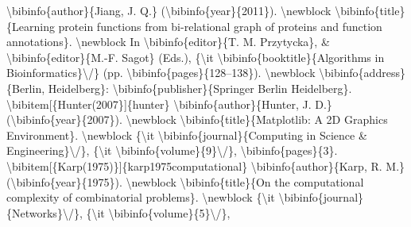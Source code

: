 \documentclass{article}%
\begin{document}
\textbackslash{}bibinfo\{author\}\{Jiang, J. Q.\} (\textbackslash{}bibinfo\{year\}\{2011\}).\newline%
\textbackslash{}newblock \textbackslash{}bibinfo\{title\}\{Learning protein functions from bi{-}relational graph\newline%
of proteins and function annotations\}.\newline%
\textbackslash{}newblock In \textbackslash{}bibinfo\{editor\}\{T. M. Przytycka\}, \& \textbackslash{}bibinfo\{editor\}\{M.{-}F.\newline%
Sagot\} (Eds.), \{\textbackslash{}it \textbackslash{}bibinfo\{booktitle\}\{Algorithms in Bioinformatics\}\textbackslash{}/\} (pp.\newline%
\textbackslash{}bibinfo\{pages\}\{128–138\}).\newline%
\textbackslash{}newblock \textbackslash{}bibinfo\{address\}\{Berlin, Heidelberg\}: \textbackslash{}bibinfo\{publisher\}\{Springer\newline%
Berlin Heidelberg\}.\newline%
\newline%
\textbackslash{}bibitem{[}\{Hunter(2007\}{]}\{hunter\}\newline%
\textbackslash{}bibinfo\{author\}\{Hunter, J. D.\} (\textbackslash{}bibinfo\{year\}\{2007\}).\newline%
\textbackslash{}newblock \textbackslash{}bibinfo\{title\}\{Matplotlib: A 2D Graphics Environment\}.\newline%
\textbackslash{}newblock \{\textbackslash{}it \textbackslash{}bibinfo\{journal\}\{Computing in Science \& Engineering\}\textbackslash{}/\}, \{\textbackslash{}it \textbackslash{}bibinfo\{volume\}\{9\}\textbackslash{}/\},\newline%
\textbackslash{}bibinfo\{pages\}\{3\}.\newline%
\textbackslash{}bibitem{[}\{Karp(1975)\}{]}\{karp1975computational\}\newline%
\textbackslash{}bibinfo\{author\}\{Karp, R. M.\} (\textbackslash{}bibinfo\{year\}\{1975\}).\newline%
\textbackslash{}newblock \textbackslash{}bibinfo\{title\}\{On the computational complexity of combinatorial\newline%
problems\}.\newline%
\textbackslash{}newblock \{\textbackslash{}it \textbackslash{}bibinfo\{journal\}\{Networks\}\textbackslash{}/\}, \{\textbackslash{}it \textbackslash{}bibinfo\{volume\}\{5\}\textbackslash{}/\},\newline%
\end{document}
